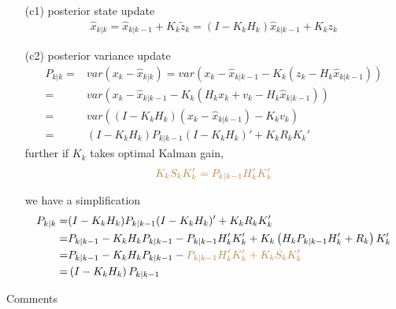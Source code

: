 \begin{itemize}[topsep=2pt,itemsep=0pt]
    
    \item[(c1)] posterior state update
    \begin{align}
        \hat{x}_{k|k}=\hat{x}_{k|k-1}+K_k\tilde{z}_k=\left(I-K_kH_k\right)\hat{x}_{k|k-1}+K_kz_k
    \end{align}
    \item[(c2)] posterior variance update
    \begin{align}\label{EqaKalmanFilterPostVarUpdate}
        P_{k|k}=&var(x_k-\hat{x}_{k|k})=var\left( x_k-\hat{x}_{k|k-1}-K_k(z_k-H_k\hat{x}_{k|k-1}) \right)\\
        =&var\left( x_k-\hat{x}_{k|k-1}-K_k(H_kx_k+v_k-H_k\hat{x}_{k|k-1}) \right)\\
        =&var\left((I-K_kH_k)(x_k-\hat{x}_{k|k-1})-K_kv_k\right)\\
        =&(I-K_kH_k)P_{k|k-1}(I-K_kH_k)'+K_kR_kK_k'
    \end{align}
    further if $ K_k $ takes optimal Kalman gain, 
    \begin{align}
        \color{brown}K_kS_kK_k'= P_{k|k-1}H_k'K_k'
    \end{align}
    
    we have a simplification
    \begin{align}
        P_{k|k}=& (I-K_kH_k)P_{k|k-1}(I-K_kH_k)'+K_kR_kK_k' \\
        =& P_{k|k-1}-K_kH_kP_{k|k-1}-P_{k|k-1}H_k'K_k' + K_k\left( H_kP_{k|k-1}H_k'+R_k\right)K_k'\\
        =&P_{k|k-1}-K_kH_kP_{k|k-1}-{\color{brown}P_{k|k-1}H_k'K_k'+K_kS_kK_k'}\\
        =&\left(I-K_kH_k\right)P_{k|k-1}
    \end{align}
    
\end{itemize}

\begin{point}
    Comments
\end{point}

